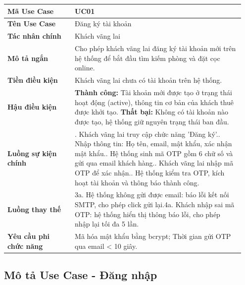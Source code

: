 \documentclass[a4paper,oneside]{report}
\begin{document}
\begin{longtable}[]{@{}>{\RaggedRight\arraybackslash}p{0.27\linewidth}>{\RaggedRight\arraybackslash}p{0.68\linewidth}@{}}
\toprule
\textbf{Mã Use Case} & UC01\tabularnewline
\midrule
\endhead
\textbf{Tên Use Case} & Đăng ký tài khoản\tabularnewline
\textbf{Tác nhân chính} & Khách vãng lai\tabularnewline
\textbf{Mô tả ngắn} & Cho phép khách vãng lai đăng ký tài khoản mới trên
hệ thống để bắt đầu tìm kiếm phòng và đặt cọc online.\tabularnewline
\textbf{Tiền điều kiện} & Khách vãng lai chưa có tài khoản trên hệ
thống.\tabularnewline
\textbf{Hậu điều kiện} & \textbf{Thành công:} Tài khoản mới được tạo ở trạng thái hoạt động (active), thông tin cơ bản của khách thuê được khởi tạo.\newline
\textbf{Thất bại:} Không có tài khoản nào được tạo, hệ thống giữ nguyên trạng thái ban đầu.\tabularnewline
\textbf{Luồng sự kiện chính} & 1. Khách vãng lai truy
cập chức năng 'Đăng ký'.\newline 2. Nhập thông tin: Họ tên, email,
mật khẩu, xác nhận mật khẩu.\newline 3. Hệ thống sinh mã OTP gồm 6
chữ số và gửi qua email khách hàng.\newline 4. Khách vãng lai nhập
mã OTP để xác nhận.\newline 5. Hệ thống kiểm tra OTP, kích hoạt tài
khoản và thông báo thành công.\tabularnewline
\textbf{Luồng thay thế} & 3a. Hệ thống không gửi được
email: báo lỗi kết nối SMTP, cho phép click gửi lại.\newline 4a.
Khách nhập sai mã OTP: hệ thống hiển thị thông báo lỗi, cho phép nhập
lại tối đa 5 lần.\tabularnewline
\textbf{Yêu cầu phi chức năng} & Mã hóa mật khẩu bằng bcrypt; Thời gian
gửi OTP qua email \textless{} 10 giây.\tabularnewline
\bottomrule
\end{longtable}

\subsection{Mô tả Use Case - Đăng nhập}
\end{document}
